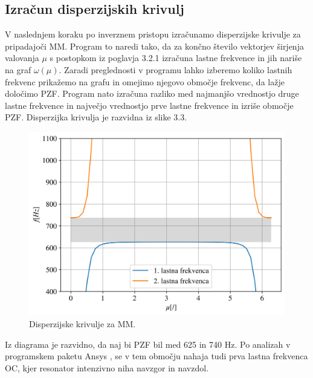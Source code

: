 \documentclass[12pt]{report}
\begin{document}
\subsection{Izračun disperzijskih krivulj}
V naslednjem koraku po inverznem pristopu izračunamo disperzijske krivulje za pripadajoči \ac{MM}. Program to naredi tako, da za končno število vektorjev širjenja valovanja $\mu$ s postopkom iz poglavja 3.2.1 izračuna
lastne frekvence in jih nariše na graf $\omega(\mu)$. Zaradi preglednosti v programu lahko izberemo koliko lastnih frekvenc prikažemo na grafu in omejimo njegovo območje frekvenc, da lažje določimo \ac{PZF}.
Program nato izračuna razliko med najmanjšo vrednostjo druge lastne frekvence in največjo vrednostjo prve lastne frekvence in izriše območje \ac{PZF}. Disperzijka krivulja je razvidna iz slike 3.3.
\begin{figure}[H]
  \centering
  \includegraphics[scale=0.8]{Images/dispersion.png}
  \caption{Disperzijske krivulje za \ac{MM}.}
\end{figure}
\noindent Iz diagrama je razvidno, da naj bi \ac{PZF} bil med 625 in 740 Hz. Po analizah v programskem paketu Ansys \cite{ansys}, se v tem območju nahaja tudi prva lastna frekvenca
\ac{OC}, kjer resonator intenzivno niha navzgor in navzdol.
\end{document}
